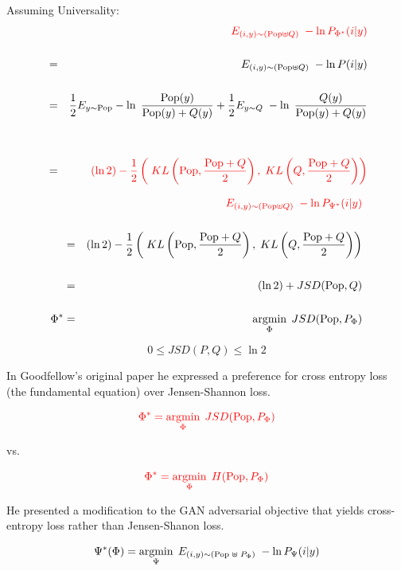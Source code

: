 {Assuming Universality:
\begin{eqnarray*}
& & {\color{red} E_{(i,y) \sim (\mathrm{Pop}\uplus Q)}\;-\ln P_{\Phi^*}(i|y)} \\
\\
& = & E_{(i,y) \sim (\mathrm{Pop}\uplus Q)}\;-\ln P(i|y) \\
\\
& = & \frac{1}{2}E_{y \sim \mathrm{Pop}} -\ln\;\frac{\mathrm{Pop}(y)}{\mathrm{Pop}(y) + Q(y)}+ \frac{1}{2} E_{y \sim Q}\; -\ln\;\frac{Q(y)}{\mathrm{Pop}(y) + Q(y)} \\
\\
\\
& = & {\color{red} (\ln 2) - \frac{1}{2} \left(\;KL\left(\mathrm{Pop},\frac{\mathrm{Pop}+Q}{2}\right),\;KL\left(Q,\frac{\mathrm{Pop}+Q}{2}\right)\right)}
\end{eqnarray*}


\begin{eqnarray*}
& & {\color{red} E_{(i,y) \sim (\mathrm{Pop}\uplus Q)}\;-\ln P_{\Psi^*}(i|y)} \\
\\
& = & (\ln 2) - \frac{1}{2} \left(\;KL\left(\mathrm{Pop},\frac{\mathrm{Pop}+Q}{2}\right),\;KL\left(Q,\frac{\mathrm{Pop}+Q}{2}\right)\right) \\
\\
& = & (\ln 2) + JSD(\mathrm{Pop},Q) \\
\\
\Phi^* & = & \operatorname*{argmin}_\Phi \; JSD(\mathrm{Pop},P_\Phi)
\end{eqnarray*}

{\color{red} $$0 \leq JSD(P,Q) \leq \ln 2$$}



In Goodfellow's original paper he expressed a preference for cross entropy loss (the fundamental equation) over Jensen-Shannon loss.

$${\color{red} \Phi^* = \operatorname*{argmin}_\Phi\;JSD(\mathrm{Pop},P_\Phi)}$$

\centerline{vs.}
\vspace{-2ex}
$${\color{red} \Phi^* = \operatorname*{argmin}_\Phi\;H(\mathrm{Pop},P_\Phi)}$$

\vfill
He presented a modification to the GAN adversarial objective that yields cross-entropy loss rather than Jensen-Shanon loss.


{\color{red} $$\Psi^*(\Phi) = \operatorname*{argmin}_\Psi \;E_{(i,y) \sim (\mathrm{Pop}\; \uplus \;P_\Phi)}\;- \ln P_\Psi(i|y)$$}

}
